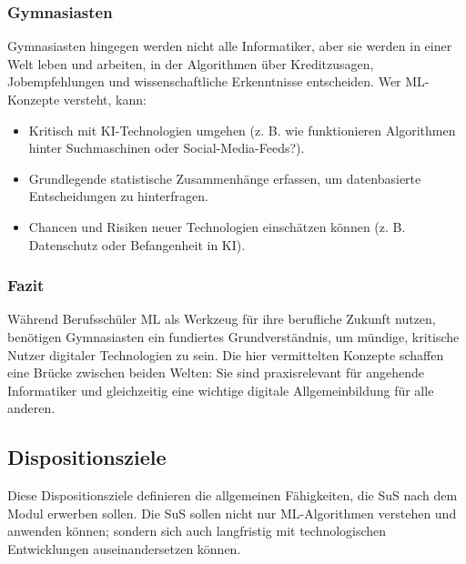 \documentclass[twocolumn]{article}
\begin{document}
\subsubsection{Gymnasiasten}

Gymnasiasten hingegen werden nicht alle Informatiker, aber sie werden in einer Welt leben und arbeiten, in der Algorithmen über Kreditzusagen, Jobempfehlungen und wissenschaftliche Erkenntnisse entscheiden. Wer ML-Konzepte versteht, kann:

\begin{itemize}
   \item Kritisch mit KI-Technologien umgehen (z. B. wie funktionieren Algorithmen hinter Suchmaschinen oder Social-Media-Feeds?).
   \item Grundlegende statistische Zusammenhänge erfassen, um datenbasierte Entscheidungen zu hinterfragen.
   \item Chancen und Risiken neuer Technologien einschätzen können (z. B. Datenschutz oder Befangenheit in KI).
\end{itemize}

\subsubsection{Fazit}

Während Berufsschüler ML als Werkzeug für ihre berufliche Zukunft nutzen, benötigen Gymnasiasten ein fundiertes Grundverständnis, um mündige, kritische Nutzer digitaler Technologien zu sein. Die hier vermittelten Konzepte schaffen eine Brücke zwischen beiden Welten: Sie sind praxisrelevant für angehende Informatiker und gleichzeitig eine wichtige digitale Allgemeinbildung für alle anderen.


\subsection{Dispositionsziele}

Diese Dispositionsziele definieren die allgemeinen Fähigkeiten, die SuS nach dem Modul erwerben sollen. Die SuS sollen nicht nur ML-Algorithmen verstehen und anwenden können; sondern sich auch langfristig mit technologischen Entwicklungen auseinandersetzen können.
\end{document}
